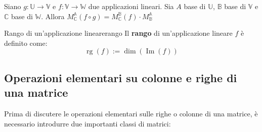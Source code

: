 \documentclass[12pt]{report}
\newcommand{\C}{\mathbb{C}}
\newcommand{\V}{\mathbb{V}}
\newcommand{\W}{\mathbb{W}}
\newcommand{\vectorspace}[1]{\mathbb{#1}}
\newcommand{\associatedmatrix}[2]{M^{\mathbb{#1}}_{\mathbb{#2}}}
\newcommand{\rg}{\operatorname{rg}}
\begin{document}
	\begin{proposizione}{}{}
		Siano $g: \vectorspace{U} \to \V$ e $f: \V \to \W$ due applicazioni lineari. Sia $A$ base di $\vectorspace{U}$, $\mathbb{B}$ base di $\V$ e $\C$ base di $\W$.
		Allora $\associatedmatrix{A}{C}(f \circ g) = \associatedmatrix{B}{C}(f) \cdot \associatedmatrix{A}{B}$
	\end{proposizione}
	
	\begin{definizione}{Rango di un'applicazione lineare}{rango}
		Il \textbf{rango} di un'applicazione lineare $f$ è definito come:
		\[
			\rg(f) := \dim(\operatorname{Im}(f))
		\]
	\end{definizione}
	
	\subsection{Operazioni elementari su colonne e righe di una matrice}
	Prima di discutere le operazioni elementari sulle righe o colonne di una matrice, è necessario introdurre due importanti classi di matrici:
\end{document}
